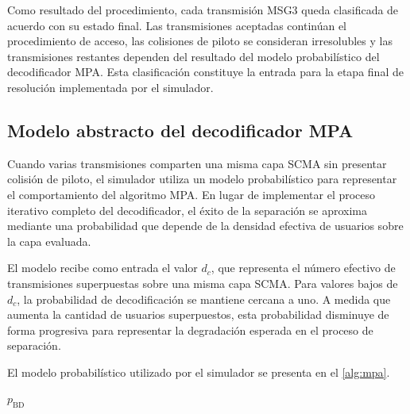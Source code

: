 Como resultado del procedimiento, cada transmisión MSG3 queda clasificada de acuerdo con su estado final. Las transmisiones aceptadas continúan el procedimiento de acceso, las colisiones de piloto se consideran irresolubles y las transmisiones restantes dependen del resultado del modelo probabilístico del decodificador MPA. Esta clasificación constituye la entrada para la etapa final de resolución implementada por el simulador.

\subsection{Modelo abstracto del decodificador MPA}
\label{sec:impl_mpa}

Cuando varias transmisiones comparten una misma capa SCMA sin presentar colisión de piloto, el simulador utiliza un modelo probabilístico para representar el comportamiento del algoritmo MPA. En lugar de implementar el proceso iterativo completo del decodificador, el éxito de la separación se aproxima mediante una probabilidad que depende de la densidad efectiva de usuarios sobre la capa evaluada.

El modelo recibe como entrada el valor $d_c$, que representa el número efectivo de transmisiones superpuestas sobre una misma capa SCMA. Para valores bajos de $d_c$, la probabilidad de decodificación se mantiene cercana a uno. A medida que aumenta la cantidad de usuarios superpuestos, esta probabilidad disminuye de forma progresiva para representar la degradación esperada en el proceso de separación.

El modelo probabilístico utilizado por el simulador se presenta en el \cref{alg:mpa}.

\begin{algorithm}[H]
\DontPrintSemicolon
\caption{Modelo abstracto del decodificador MPA}
\label{alg:mpa}



\Return $p_{\mathrm{BD}}$\;

\end{algorithm}

